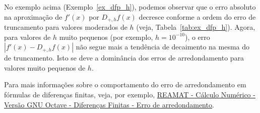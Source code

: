 \begin{obs}
  No exemplo acima (Exemplo~\ref{ex_dfp_h}), podemos observar que o erro absoluto na aproximação de $f'(x)$ por $D_{+,h}f(x)$ decresce conforme a ordem do erro de truncamento para valores moderados de $h$ (veja, Tabela~\ref{tab:ex_dfp_h}). Agora, para valores de $h$ muito pequenos (por exemplo, $h=10^{-10}$), o erro $|f'(x)-D_{+,h}f(x)|$ não segue mais a tendência de decaimento na mesma do de truncamento. Isto se deve a dominância dos erros de arredondamento para valores muito pequenos de $h$. 

  Para mais informações sobre o comportamento do erro de arredondamento em fórmulas de diferenças finitas, veja, por exemplo, \href{https://www.ufrgs.br/reamat/CalculoNumerico/livro-oct/dn-diferencas_finitas.html}{REAMAT - Cálculo Numérico - Versão GNU Octave - Diferenças Finitas - Erro de arredondamento}.
\end{obs}


\emconstrucao